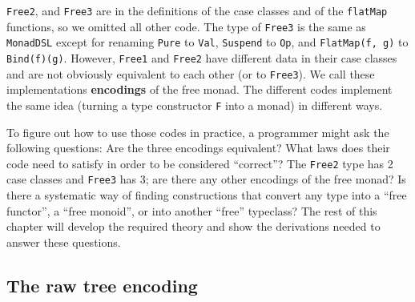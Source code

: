 \lstinline!Free2!, and
\lstinline!Free3! are in
the definitions of the case classes and of the \lstinline!flatMap!
functions, so we omitted all other code. The type of \lstinline!Free3!
is the same as \lstinline!MonadDSL!
except for renaming \lstinline!Pure!
to \lstinline!Val!, \lstinline!Suspend!
to \lstinline!Op!, and
\lstinline!FlatMap(f, g)!
to \lstinline!Bind(f)(g)!.
However, \lstinline!Free1!
and \lstinline!Free2! have
different data in their case classes and are not obviously equivalent
to each other (or to \lstinline!Free3!).
We call these implementations \textbf{encodings}
of the free monad. The different codes implement the same idea (turning
a type constructor \lstinline!F!
into a monad) in different ways.

To figure out how to use those codes in practice, a programmer might
ask the following questions: Are the three encodings equivalent? What
laws does their code need to satisfy in order to be considered \textsf{``}correct\textsf{''}?
The \lstinline!Free2! type
has 2 case classes and \lstinline!Free3!
has 3; are there any other encodings of the free monad? Is there a
systematic way of finding constructions that convert any type into
a \textsf{``}free functor\textsf{''}, a \textsf{``}free monoid\textsf{''}, or into another \textsf{``}free\textsf{''}
typeclass? The rest of this chapter will develop the required theory
and show the derivations needed to answer these questions. 

\subsection{The raw tree encoding}

